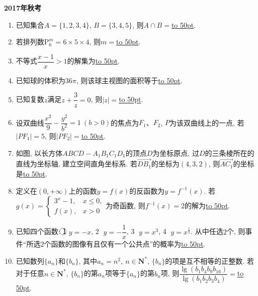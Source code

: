 \documentclass[10pt,a4paper]{article}
\newcommand{\blank}[1]{\underline{\hbox to #1pt{}}}
\begin{document}
\newpage

{\bf 2017年秋考}
\begin{enumerate}[1.]
\item 已知集合$A=\{1,2,3,4\}$, $B=\{3,4,5\}$, 则$A\cap B=$\blank{50}.
\item 若排列数$\mathrm{P}_6^m=6\times 5\times 4$, 则$m=$\blank{50}.
\item 不等式$\dfrac{x-1}{x}>1$的解集为\blank{50}.
\item 已知球的体积为$36\pi$, 则该球主视图的面积等于\blank{50}.
\item 已知复数$z$满足$z+\dfrac{3}{z}=0$, 则$|z|=$\blank{50}.
\item 设双曲线$\dfrac{x^2}{9}-\dfrac{y^2}{b^2}=1 \ (b>0)$的焦点为$F_1$、$F_2$, $P$为该双曲线上的一点, 若$|PF_1|=5$, 则$|PF_2|=$\blank{50}.
\item 如图, 以长方体$ABCD-A_1B_1C_1D_1$的顶点$D$为坐标原点, 过$D$的三条棱所在的直线为坐标轴, 建立空间直角坐标系. 若$\overrightarrow{DB_1}$的坐标为$(4,3,2)$, 则$\overrightarrow{AC_1}$的坐标是\blank{50}.
\begin{center}
\end{center}
\item 定义在$(0,+\infty)$上的函数$y=f(x)$的反函数为$y=f^{-1}(x)$. 若$g(x)=\begin{cases}3^x-1, & x\le 0,\\ f(x), & x>0\end{cases}$为奇函数, 则$f^{-1}(x)=2$的解为\blank{50}.
\item 已知四个函数: \textcircled{1} $y=-x$, \textcircled{2} $y=-\dfrac{1}{x}$, \textcircled{3} $y=x^3$, \textcircled{4} $y=x^{\frac{1}{2}}$. 从中任选$2$个, 则事件``所选$2$个函数的图像有且仅有一个公共点''的概率为\blank{50}.
\item 已知数列$\{a_n\}$和$\{b_n\}$, 其中$a_n=n^2, \ n\in \mathbf{N}^*$, $\{b_n\}$的项是互不相等的正整数. 若对于任意$n\in \mathbf{N}^*$, $\{b_n\}$的第$a_n$项等于$\{a_n\}$的第$b_n$项, 则$\dfrac{\lg (b_1b_4b_9b_{16})}{\lg(b_1b_2b_3b_4)}=$\blank{50}.

\end{enumerate}
\end{document}
